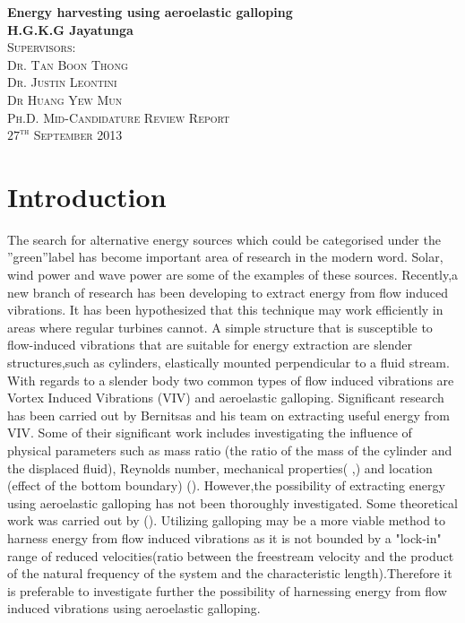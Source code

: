 \documentclass{article}
\begin{document}
\begin{titlepage}
\begin{center}
{\huge \bfseries Energy harvesting using aeroelastic galloping}\\[2.5cm]
{\LARGE \bfseries H.G.K.G Jayatunga}\\[2.5cm]
\textsc{\Large Supervisors:\\[0.5cm] Dr. Tan Boon Thong \\[0.4cm] Dr. Justin Leontini \\[0.5cm] Dr Huang Yew Mun}\\[6.5cm]
\textsc{\Large Ph.D. Mid-Candidature Review Report}\\

\vfill
\textsc{\Large $27^{\text{th}}$ September 2013}
\end{center}
\end{titlepage}
\tableofcontents

\section{Introduction}
The search for alternative energy sources which could be categorised under the ”green”label has become important area of research in the modern word. Solar, wind power and wave power are some of the examples of these sources. Recently,a new branch of research has been developing to extract energy from flow induced vibrations. It has been hypothesized that this technique may work efficiently in areas where regular turbines cannot.
A simple structure that is susceptible to flow-induced vibrations that are suitable for energy extraction are slender structures,such as cylinders, elastically mounted perpendicular to a fluid stream. With regards to a slender body two common types of   flow induced vibrations are Vortex Induced Vibrations (VIV) and aeroelastic galloping. Significant research has been carried out by Bernitsas and his team on extracting useful energy from VIV. Some of their significant work includes investigating the influence  of physical parameters such as mass ratio (the ratio of the mass of the cylinder and the displaced fluid), Reynolds number, mechanical properties(\cite{Raghavan2010a} ,\cite{Lee2011b}) and location (effect of the bottom boundary) (\cite{Raghavan2009}). However,the possibility of extracting energy using aeroelastic galloping has not been thoroughly investigated. Some theoretical work was carried out by (\cite{Barrero-Gil2010a}). Utilizing galloping may be a more viable method to harness energy from flow induced vibrations as it is not bounded by a "lock-in" range of reduced velocities(ratio between the freestream velocity and the product of the natural frequency of the system and the characteristic length).Therefore it is preferable to investigate further the possibility of harnessing energy from flow induced vibrations using aeroelastic galloping. 
\end{document}
